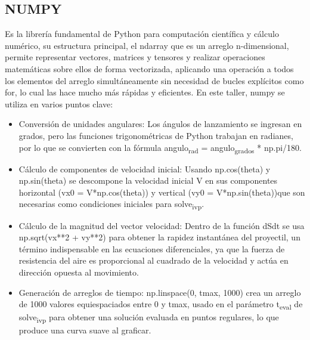 \documentclass{article}
\begin{document}
\subsection{NUMPY}
\label{sec:orgdb9ec2e}
Es la librería fundamental de Python para computación científica y cálculo numérico, su estructura principal, el ndarray que es un arreglo n-dimensional, permite representar vectores, matrices y tensores
y realizar operaciones matemáticas sobre ellos de forma vectorizada, aplicando una operación a todos los elementos del arreglo simultáneamente sin necesidad de bucles explícitos como for,
lo cual las hace mucho más rápidas y eficientes.
En este taller, numpy se utiliza en varios puntos clave:
\begin{itemize}
\item Conversión de unidades angulares: Los ángulos de lanzamiento se ingresan en grados, pero las funciones trigonométricas de Python trabajan en radianes, por lo que se convierten con la fórmula
angulo\textsubscript{rad} = angulo\textsubscript{grados} * np.pi/180.
\item Cálculo de componentes de velocidad inicial: Usando np.cos(theta) y np.sin(theta) se descompone la velocidad inicial V en sus componentes horizontal (vx0 = V*np.cos(theta)) y vertical
(vy0 = V*np.sin(theta))que son necesarias como condiciones iniciales para solve\textsubscript{ivp}.
\item Cálculo de la magnitud del vector velocidad: Dentro de la función dSdt se usa np.sqrt(vx**2 + vy**2) para obtener la rapidez instantánea del proyectil, un término indispensable en
las ecuaciones diferenciales, ya que la fuerza de resistencia del aire es proporcional al cuadrado de la velocidad y actúa en dirección opuesta al movimiento.
\item Generación de arreglos de tiempo: np.linspace(0, tmax, 1000) crea un arreglo de 1000 valores equiespaciados entre 0 y tmax, usado en el parámetro t\textsubscript{eval} de solve\textsubscript{ivp}
para obtener una solución evaluada en puntos regulares, lo que produce una curva suave al graficar.
\end{itemize}
\end{document}
